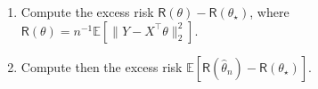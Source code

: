 \documentclass[a4paper,10pt,fleqn]{article}
\newcommand{\eqsp}{\,}
\newcommand{\1}{\ensuremath{\mathbbm{1}}}
\newcommand{\bE}{\mathbb{E}}
\newcommand{\param}{\theta}
\begin{document}
\begin{enumerate}
\item  Compute the excess risk $\mathsf{R}(\param)-\mathsf{R}(\param_\star)$, where $\mathsf{R}(\param) = n^{-1}\bE[\|Y - X^\top \param\|_2^2]$.

%
\item  Compute then the excess risk $\bE[\mathsf{R}(\widehat \param_n)-\mathsf{R}(\param_\star)]$.

%

\end{enumerate}
\end{document}
